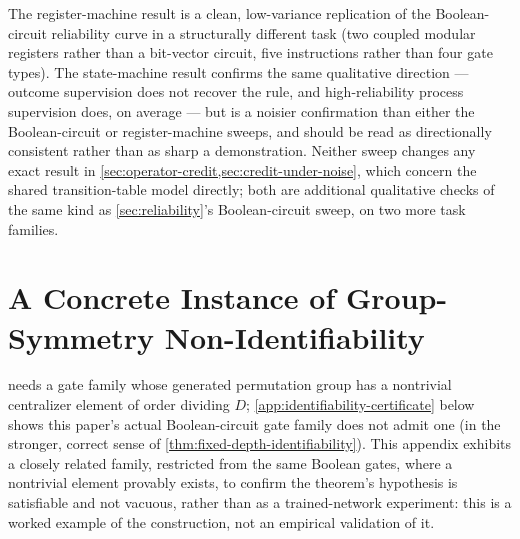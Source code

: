 The register-machine result is a clean, low-variance replication of the
Boolean-circuit reliability curve in a structurally different task (two
coupled modular registers rather than a bit-vector circuit, five
instructions rather than four gate types). The state-machine result
confirms the same qualitative direction --- outcome supervision does not
recover the rule, and high-reliability process supervision does, on
average --- but is a noisier confirmation than either the Boolean-circuit
or register-machine sweeps, and should be read as directionally
consistent rather than as sharp a demonstration. Neither sweep changes
any exact result in \cref{sec:operator-credit,sec:credit-under-noise},
which concern the shared transition-table model directly; both are
additional qualitative checks of the same kind as \cref{sec:reliability}'s
Boolean-circuit sweep, on two more task families.

\section{A Concrete Instance of Group-Symmetry Non-Identifiability}
\label{app:shift-symmetry-task}

 needs a gate family whose
generated permutation group has a nontrivial centralizer element of order
dividing $D$; \cref{app:identifiability-certificate} below shows this
paper's actual Boolean-circuit gate family does not admit one (in the
stronger, correct sense of \cref{thm:fixed-depth-identifiability}). This
appendix exhibits a closely related family, restricted from the same
Boolean gates, where a nontrivial element provably exists, to confirm the
theorem's hypothesis is satisfiable and not vacuous, rather than as a
trained-network experiment: this is a worked example of the construction,
not an empirical validation of it.

